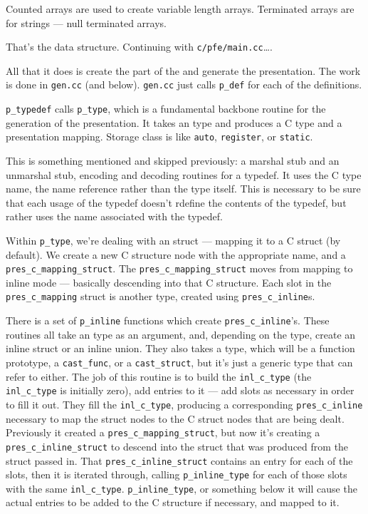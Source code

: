 Counted arrays are used to create \CORBA{} variable length arrays.  Terminated
arrays are for \CORBA{} strings --- null terminated arrays.

That's the \PRESC{} data structure.  Continuing with
\texttt{c/pfe/main.cc}\ldots{}.

All that it does is create the \MINT{} part of the \PRESC{} and generate the
presentation.  The work is done in \texttt{gen.cc} (and below).
\texttt{gen.cc} just calls \texttt{p\_def} for each of the definitions.

\texttt{p\_typedef} calls \texttt{p\_type}, which is a fundamental backbone
routine for the generation of the presentation.  It takes an \AOI{} type and
produces a C type and a presentation mapping.  Storage class is like
\texttt{auto}, \texttt{register}, or \texttt{static}.

This is something mentioned and skipped previously: a marshal stub and an
unmarshal stub, \XDR{} encoding and decoding routines for a typedef.  It uses the
C type name, the name reference rather than the type itself.  This is necessary
to be sure that each usage of the typedef doesn't rdefine the contents of the
typedef, but rather uses the name associated with the typedef.

Within \texttt{p\_type}, we're dealing with an \AOI{} struct --- mapping it to a C
struct (by default).  We create a new C structure node with the appropriate
name, and a \texttt{pres\_c\_mapping\_struct}.  The
\texttt{pres\_c\_mapping\_struct} moves from mapping to inline mode ---
basically descending into that C structure.  Each slot in the
\texttt{pres\_c\_mapping} struct is another type, created using
\texttt{pres\_c\_inline}s.

There is a set of \texttt{p\_inline} functions which create
\texttt{pres\_c\_inline}'s.  These routines all take an \AOI{} type as an
argument, and, depending on the \AOI{} type, create an inline struct or an inline
union.  They also takes a \CAST{} type, which will be a function prototype, a
\texttt{cast\_func}, or a \texttt{cast\_struct}, but it's just a generic \CAST{}
type that can refer to either.  The job of this routine is to build the
\texttt{inl\_c\_type} (the \texttt{inl\_c\_type} is initially zero), add
entries to it --- add slots as necessary in order to fill it out.  They fill
the \texttt{inl\_c\_type}, producing a corresponding \texttt{pres\_c\_inline}
necessary to map the \MINT{} struct nodes to the C struct nodes that are being
dealt.  Previously it created a \texttt{pres\_c\_mapping\_struct}, but now it's
creating a \texttt{pres\_c\_inline\_struct} to descend into the \MINT{} struct
that was produced from the \AOI{} struct passed in.  That
\texttt{pres\_c\_inline\_struct} contains an entry for each of the slots, then
it is iterated through, calling \texttt{p\_inline\_type} for each of those
slots with the same \texttt{inl\_c\_type}.  \texttt{p\_inline\_type}, or
something below it will cause the actual entries to be added to the C structure
if necessary, and mapped to it.

